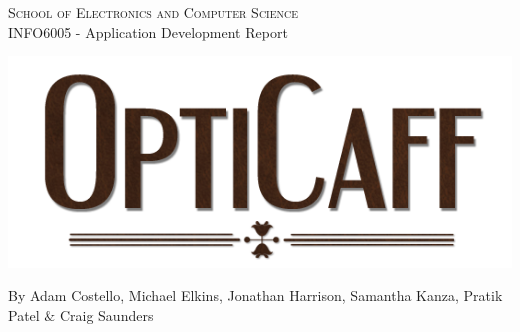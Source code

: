 
\begin{titlepage}
	
\begin{center}

\textsc{\huge{School of Electronics and Computer Science}}\\[2cm]

\huge{INFO6005 - Application Development Report}\\[6cm]

\begin{center}
\includegraphics[trim = 0mm 0mm 0mm 0mm, clip, scale=0.8]{images/Logo.png}
\end{center}

\vfill 

\LARGE{By Adam Costello, Michael Elkins, Jonathan Harrison, Samantha Kanza, Pratik Patel $\&$ Craig Saunders}

\end{center}

\end{titlepage}
